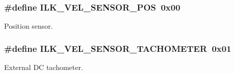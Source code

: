 \subsubsection[{\texorpdfstring{I\+L\+K\+\_\+\+V\+E\+L\+\_\+\+S\+E\+N\+S\+O\+R\+\_\+\+P\+OS}{ILK_VEL_SENSOR_POS}}]{\setlength{\rightskip}{0pt plus 5cm}\#define I\+L\+K\+\_\+\+V\+E\+L\+\_\+\+S\+E\+N\+S\+O\+R\+\_\+\+P\+OS~0x00}\hypertarget{group__IL__CONST__VEL__SENSOR_ga84b8ae078f55b0fe678b42ba33ecbffb}{}\label{group__IL__CONST__VEL__SENSOR_ga84b8ae078f55b0fe678b42ba33ecbffb}


Position sensor. 

\subsubsection[{\texorpdfstring{I\+L\+K\+\_\+\+V\+E\+L\+\_\+\+S\+E\+N\+S\+O\+R\+\_\+\+T\+A\+C\+H\+O\+M\+E\+T\+ER}{ILK_VEL_SENSOR_TACHOMETER}}]{\setlength{\rightskip}{0pt plus 5cm}\#define I\+L\+K\+\_\+\+V\+E\+L\+\_\+\+S\+E\+N\+S\+O\+R\+\_\+\+T\+A\+C\+H\+O\+M\+E\+T\+ER~0x01}\hypertarget{group__IL__CONST__VEL__SENSOR_ga5e2000096458f2759519f81411f2f25e}{}\label{group__IL__CONST__VEL__SENSOR_ga5e2000096458f2759519f81411f2f25e}


External DC tachometer. 

